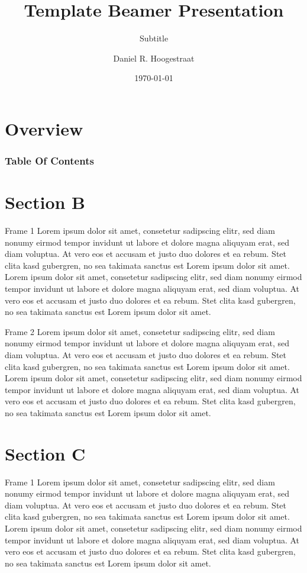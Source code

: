 \documentclass[handout]{beamer}
\title{Template Beamer Presentation}
\subtitle{Subtitle}
\author{Daniel R. Hoogestraat}
\institute{Molecular Diagnosis Microbiology Division\\University of Washington {\Medium Seattle, WA}}
\date{\today}
\begin{document}
\maketitle

\section*{Overview}
\begin{frame}
	\frametitle{Table Of Contents}
	\tableofcontents[hideallsubsections]
\end{frame}

\section{Section B}

\begin{frame}{Frame 1}
	Lorem ipsum dolor sit amet, consetetur sadipscing elitr, sed diam nonumy eirmod tempor invidunt ut labore et dolore magna aliquyam erat, sed diam voluptua. At vero eos et accusam et justo duo dolores et ea rebum. Stet clita kasd gubergren, no sea takimata sanctus est Lorem ipsum dolor sit amet. Lorem  ipsum dolor sit amet, consetetur sadipscing elitr, sed diam nonumy eirmod tempor invidunt ut labore et dolore magna aliquyam erat, sed diam voluptua. At vero eos et accusam et justo duo dolores et ea rebum. Stet clita kasd gubergren, no sea takimata sanctus est Lorem ipsum dolor sit amet.
\end{frame}

\begin{frame}{Frame 2}
	Lorem ipsum dolor sit amet, consetetur sadipscing elitr, sed diam nonumy eirmod tempor invidunt ut labore et dolore magna aliquyam erat, sed diam voluptua. At vero eos et accusam et justo duo dolores et ea rebum. Stet clita kasd gubergren, no sea takimata sanctus est Lorem ipsum dolor sit amet. Lorem  ipsum dolor sit amet, consetetur sadipscing elitr, sed diam nonumy eirmod tempor invidunt ut labore et dolore magna aliquyam erat, sed diam voluptua. At vero eos et accusam et justo duo dolores et ea rebum. Stet clita kasd gubergren, no sea takimata sanctus est Lorem ipsum dolor sit amet.
\end{frame}

\section{Section C}
\begin{frame}{Frame 1}
	Lorem ipsum dolor sit amet, consetetur sadipscing elitr, sed diam nonumy eirmod tempor invidunt ut labore et dolore magna aliquyam erat, sed diam voluptua. At vero eos et accusam et justo duo dolores et ea rebum. Stet clita kasd gubergren, no sea takimata sanctus est Lorem ipsum dolor sit amet. Lorem  ipsum dolor sit amet, consetetur sadipscing elitr, sed diam nonumy eirmod tempor invidunt ut labore et dolore magna aliquyam erat, sed diam voluptua. At vero eos et accusam et justo duo dolores et ea rebum. Stet clita kasd gubergren, no sea takimata sanctus est Lorem ipsum dolor sit amet.
\end{frame}
\end{document}

